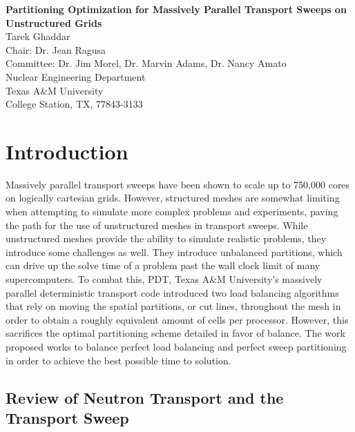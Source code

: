 \documentclass[11pt, letterpaper,titlepage,oneside]{article}
\newcommand{\titles}{\LARGE \textbf{Partitioning Optimization for Massively Parallel Transport Sweeps on Unstructured Grids}}
\newcommand{\authors}{\normalsize Tarek Ghaddar \\ Chair: Dr. Jean Ragusa \\ Committee: Dr. Jim Morel, Dr. Marvin Adams, Dr. Nancy Amato}
\newcommand{\department}{\normalsize Nuclear Engineering Department}
\newcommand{\university}{\normalsize Texas A\&M University}
\newcommand{\locations}{\normalsize College Station, TX, 77843-3133}
\begin{document}

\begin{titlepage}
\begin{center}
  \vspace*{3.81 cm}
  \titles\\
  \vspace*{4.445cm}
  \authors \\
  \vspace*{2.54cm} 
  \department \\
  \university \\
  \locations \\
\end{center}
\end{titlepage}


\section{Introduction}
Massively parallel transport sweeps have been shown to scale up to 750,000 cores on logically cartesian grids. However, structured meshes are somewhat limiting when attempting to simulate more complex problems and experiments, paving the path for the use of unstructured meshes in transport sweeps. While unstructured meshes provide the ability to simulate realistic problems, they introduce some challenges as well. They introduce unbalanced partitions, which can drive up the solve time of a problem past the wall clock limit of many supercomputers. To combat this, PDT, Texas A\&M University's massively parallel deterministic transport code introduced two load balancing algorithms that rely on moving the spatial partitions, or cut lines, throughout the mesh in order to obtain a roughly equivalent amount of cells per processor. However, this sacrifices the optimal partitioning scheme detailed in favor of balance. The work proposed works to balance perfect load balancing and perfect sweep partitioning in order to achieve the best possible time to solution.

\subsection{Review of Neutron Transport and the Transport Sweep}
\end{document}
